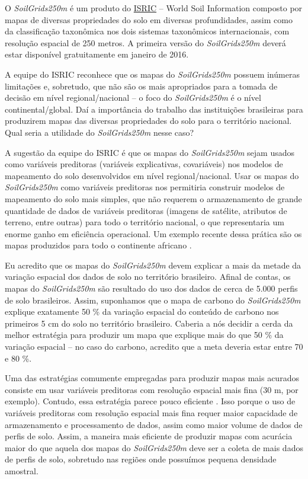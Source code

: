 O \textit{SoilGrids250m} é um produto do \href{http://www.isric.org/}{ISRIC} -- 
World Soil Information composto por mapas de diversas propriedades do solo em 
diversas profundidades, assim como da classificação taxonômica nos dois sistemas
taxonômicos internacionais, com resolução espacial de 250 metros. A primeira 
versão do \textit{SoilGrids250m} deverá estar disponível gratuitamente em 
janeiro de 2016.

A equipe do ISRIC reconhece que os mapas do \textit{SoilGrids250m} possuem 
inúmeras limitações e, sobretudo, que não são os mais apropriados para a tomada 
de decisão em nível regional/nacional -- o foco do \textit{SoilGrids250m} é o 
nível continental/global. Daí a importância do trabalho das instituições 
brasileiras para produzirem mapas das diversas propriedades do solo para o 
território nacional. Qual seria a utilidade do \textit{SoilGrids250m} nesse 
caso?

A sugestão da equipe do ISRIC é que os mapas do \textit{SoilGrids250m} sejam 
usados como variáveis preditoras (variáveis explicativas, covariáveis) nos 
modelos de mapeamento do solo desenvolvidos em nível regional/nacional. Usar os 
mapas do \textit{SoilGrids250m} como variáveis preditoras nos permitiria 
construir modelos de mapeamento do solo mais simples, que não requerem o 
armazenamento de grande quantidade de dados de variáveis preditoras (imagens de 
satélite, atributos de terreno, entre outras) para todo o território nacional, 
o que representaria um enorme ganho em eficiência operacional. Um exemplo 
recente dessa prática são os mapas produzidos para todo o continente africano 
\citep{HenglEtAl2015}.

Eu acredito que os mapas do \textit{SoilGrids250m} devem explicar a mais da 
metade da variação espacial dos dados de solo no território brasileiro. Afinal 
de contas, os mapas do \textit{SoilGrids250m} são resultado do uso dos dados de 
cerca de 5.000 perfis de solo brasileiros. Assim, suponhamos que o mapa de 
carbono do \textit{SoilGrids250m} explique exatamente 50 \% da variação espacial
do conteúdo de carbono nos primeiros 5 cm do solo no território brasileiro. 
Caberia a nós decidir a cerda da melhor estratégia para produzir um mapa que 
explique mais do que 50 \% da variação espacial -- no caso do carbono, acredito
que a meta deveria estar entre 70 e 80 \%.

Uma das estratégias comumente empregadas para produzir mapas mais acurados 
consiste em usar variáveis preditoras com resolução espacial mais fina (30 m, 
por exemplo). Contudo, essa estratégia parece pouco eficiente 
\citep{Samuel-RosaEtAl2015}. Isso porque o uso de variáveis preditoras com 
resolução espacial mais fina requer maior capacidade de armazenamento e 
processamento de dados, assim como maior volume de dados de perfis de solo. 
Assim, a maneira mais eficiente de produzir mapas com acurácia maior do que 
aquela dos mapas do \textit{SoilGrids250m} deve ser a coleta de mais dados de 
perfis de solo, sobretudo nas regiões onde possuímos pequena densidade amostral.

